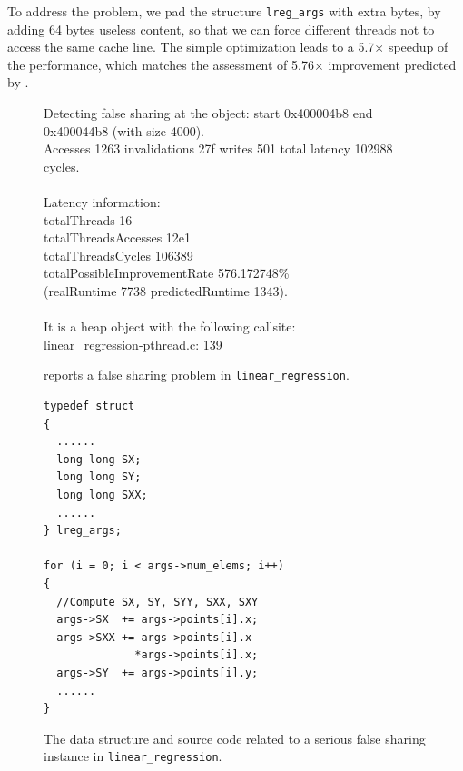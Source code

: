 To address the problem, we pad the structure {\tt lreg\_args} with extra bytes, by adding 64 bytes useless content, so that we can force different threads not to access the same cache line. The simple optimization leads to a 5.7$\times$ speedup of the performance, which matches the assessment of 5.76$\times$ improvement predicted by \cheetah{}.

\begin{figure}
\begin{minipage}{\columnwidth}

\centering

\fbox
{
\begin{minipage}{3in}
Detecting false sharing at the object: start 0x400004b8 end 0x400044b8 (with size 4000). \\
Accesses 1263 invalidations 27f writes 501 total latency 102988 cycles.\\
\\
Latency information: \\
totalThreads 16 \\
totalThreadsAccesses 12e1 \\
totalThreadsCycles 106389 \\
totalPossibleImprovementRate 576.172748\% \\
(realRuntime 7738 predictedRuntime 1343).\\
\\
It is a heap object with the following callsite:\\
linear\_regression-pthread.c: 139
\end{minipage}
}
\vspace{1em}
\caption{\cheetah{} reports a false sharing problem in \texttt{linear\_regression}.}
\label{fig:lr}
\end{minipage}
\end{figure}


\begin{figure}
\begin{verbatim}
typedef struct
{
  ......  
  long long SX;
  long long SY;
  long long SXX;
  ......
} lreg_args;	

for (i = 0; i < args->num_elems; i++)
{
  //Compute SX, SY, SYY, SXX, SXY
  args->SX  += args->points[i].x;
  args->SXX += args->points[i].x
              *args->points[i].x;
  args->SY  += args->points[i].y;
  ......
}
\end{verbatim}
\caption{The data structure and source code related to a serious false sharing instance in \texttt{linear\_regression}.}
\label{lr:code}
\end{figure}

